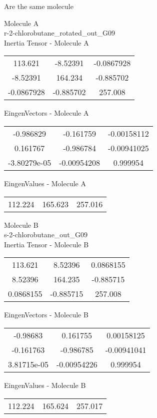 \begin{center}
\vtab
\vtab
\textcolor{NavyBlue}{\Large Are the same molecule}
\end{center}
\newpage
\begin{multicols}{2}
\begin{center}
Molecule A \\ 
r-2-chlorobutane\_rotated\_out\_G09
\\
Inertia Tensor - Molecule A \\
\vtab
\begin{tabular}{|c c c|}
113.621	 & 	-8.52391	 & 	-0.0867928	 \\
-8.52391	 & 	164.234	 & 	-0.885702	 \\
-0.0867928	 & 	-0.885702	 & 	257.008
\end{tabular}

\vtab
 EingenVectors - Molecule A     \\
\vtab
\begin{tabular}{|c c c|}
-0.986829	 & 	-0.161759	 & 	-0.00158112	 \\
0.161767	 & 	-0.986784	 & 	-0.00941025	 \\
-3.80279e-05	 & 	-0.00954208	 & 	0.999954
\end{tabular}

\vtab
 EingenValues - Molecule A     \\
\vtab
\begin{tabular}{|c c c|}
112.224	 & 	165.623	 & 	257.016
\end{tabular}
\columnbreak

Molecule B \\ 
s-2-chlorobutane\_out\_G09
\\
Inertia Tensor - Molecule B \\
\vtab
\begin{tabular}{|c c c|}
113.621	 & 	8.52396	 & 	0.0868155	 \\
8.52396	 & 	164.235	 & 	-0.885715	 \\
0.0868155	 & 	-0.885715	 & 	257.008
\end{tabular}

\vtab
 EingenVectors - Molecule B     \\
\vtab
\begin{tabular}{|c c c|}
-0.98683	 & 	0.161755	 & 	0.00158125	 \\
-0.161763	 & 	-0.986785	 & 	-0.00941041	 \\
3.81715e-05	 & 	-0.00954226	 & 	0.999954
\end{tabular}

\vtab
 EingenValues - Molecule B     \\
\vtab
\begin{tabular}{|c c c|}
112.224	 & 	165.624	 & 	257.017
\end{tabular}

\end{center}
\end{multicols}
